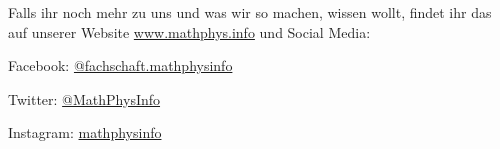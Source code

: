 Falls ihr noch mehr zu uns und was wir so machen, wissen wollt, findet ihr das auf unserer Website \url{www.mathphys.info} und Social Media: 
\begin{compactitem}
\item[\faFacebookSquare] Facebook: \href{https://www.facebook.com/fachschaft.mathphysinfo}{@fachschaft.mathphysinfo}
\item[\faTwitterSquare] Twitter: \href{https://twitter.com/MathPhysInfo}{@MathPhysInfo}
\item[\faInstagram] Instagram: \href{https://www.instagram.com/mathphysinfo/}{mathphysinfo}
\end{compactitem}